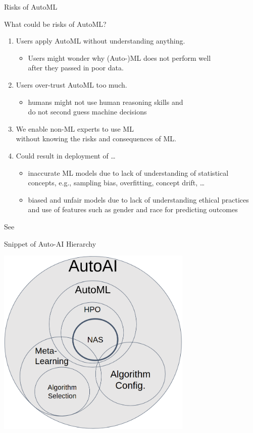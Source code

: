 \begin{frame}[c]{Risks of AutoML}

What could be risks of AutoML?

\begin{enumerate}
  \item Users apply AutoML without understanding anything.
  \begin{itemize}
    \item Users might wonder why (Auto-)ML does not perform well\\ after they passed in poor data. 
  \end{itemize}
  \pause
  \item Users over-trust AutoML too much.
  \begin{itemize}
    \item humans might not use human reasoning skills and\\ do not second guess machine decisions
  \end{itemize}
  \pause
  \item We enable non-ML experts to use ML\\ without knowing the risks and consequences of ML.
  \pause
  \item Could result in deployment of \ldots
  \begin{itemize}
    \item inaccurate ML models due to lack of understanding of statistical concepts, e.g., sampling bias, overfitting, concept drift, \ldots
    \item biased and unfair models due to lack of understanding ethical practices and use of features such as gender and race for predicting outcomes
  \end{itemize}
\end{enumerate}

See 

\end{frame}
\begin{frame}[c]{Snippet of Auto-AI Hierarchy}

\centering
\includegraphics[width=0.7\textwidth]{images/autoai}

\end{frame}
